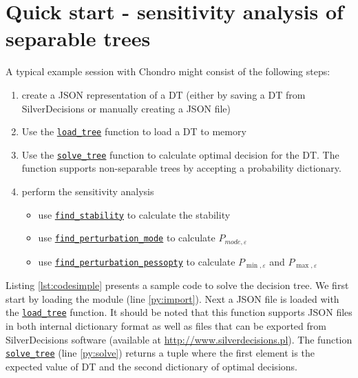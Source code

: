 \documentclass[a4paper,10pt,english]{sphinxmanual}
\begin{document}
	\section{Quick start - sensitivity analysis of separable trees}
	A typical example session with  Chondro might consist of the following steps:
	\begin{enumerate}
		\item create a JSON representation of a DT (either by saving a DT from SilverDecisions or manually creating a JSON file)		
		\item Use the \hyperref[index:chondro.load_tree]{\texttt{load\_tree}} function to load a DT to memory
		\item Use the \hyperref[index:chondro.solve_tree]{\texttt{solve\_tree}} function to calculate optimal decision for the DT. The function supports non-separable trees by accepting a probability dictionary.
		\item perform the sensitivity analysis
		\begin{itemize}
			\item use \hyperref[index:chondro.find_stability]{\texttt{find\_stability}} to calculate the stability 
			\item use \hyperref[index:chondro.find_perturbation_mode]{\texttt{find\_perturbation\_mode}} to calculate $P_{mode,\varepsilon}$
								
			\item use \hyperref[index:chondro.find_perturbation_pessopty]{
					\texttt{find\_perturbation\_pessopty}} to calculate $P_{\min,\varepsilon}$ and $P_{\max,\varepsilon}$
		\end{itemize}

	\end{enumerate}
	
	Listing \ref{lst:codesimple} presents a sample code to solve the decision tree. We first start by loading the module (line \ref{py:import}). Next a JSON file is loaded with the \hyperref[index:chondro.load_tree]{\texttt{load\_tree}}  function. It should be noted that this function supports JSON files in both internal dictionary format as well as files that can be exported from SilverDecisions software (available at \url{http://www.silverdecisions.pl}). The function \hyperref[index:chondro.solve_tree]{\texttt{solve\_tree}} (line \ref{py:solve}) returns a tuple where the first element is the expected value of DT and the second dictionary of optimal decisions. 
	
\end{document}
